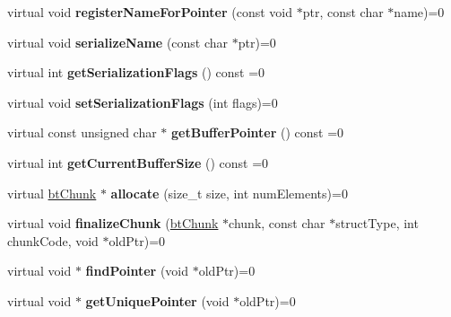 \begin{DoxyCompactItemize}
\item 
\mbox{\label{classbtSerializer_af4e2e226d06cd9264df03431fc376f25}} 
virtual void {\bfseries register\+Name\+For\+Pointer} (const void $\ast$ptr, const char $\ast$name)=0
\item 
\mbox{\label{classbtSerializer_a6f412ae1276a14cc818f4fd6b3cf167c}} 
virtual void {\bfseries serialize\+Name} (const char $\ast$ptr)=0
\item 
\mbox{\label{classbtSerializer_a634cc0d456c8d5bb2e2d242faf192787}} 
virtual int {\bfseries get\+Serialization\+Flags} () const =0
\item 
\mbox{\label{classbtSerializer_a1f46d70e6fd62daaccedc06073617203}} 
virtual void {\bfseries set\+Serialization\+Flags} (int flags)=0
\item 
\mbox{\label{classbtSerializer_ab61470624eb1e6d06d7de2943d2d92d0}} 
virtual const unsigned char $\ast$ {\bfseries get\+Buffer\+Pointer} () const =0
\item 
\mbox{\label{classbtSerializer_a49fa3c64ab1504a7a158f02c174e114f}} 
virtual int {\bfseries get\+Current\+Buffer\+Size} () const =0
\item 
\mbox{\label{classbtSerializer_a0bc96e86971e3410f66bc64bbce8ec81}} 
virtual \hyperlink{classbtChunk}{bt\+Chunk} $\ast$ {\bfseries allocate} (size\+\_\+t size, int num\+Elements)=0
\item 
\mbox{\label{classbtSerializer_ac98913802b276eed28d745ef422ac724}} 
virtual void {\bfseries finalize\+Chunk} (\hyperlink{classbtChunk}{bt\+Chunk} $\ast$chunk, const char $\ast$struct\+Type, int chunk\+Code, void $\ast$old\+Ptr)=0
\item 
\mbox{\label{classbtSerializer_a6f0e64395af88f0a3f43bf0b4ed90a39}} 
virtual void $\ast$ {\bfseries find\+Pointer} (void $\ast$old\+Ptr)=0
\item 
\mbox{\label{classbtSerializer_ab47015de46266c378ebba6329e71a5d6}} 
virtual void $\ast$ {\bfseries get\+Unique\+Pointer} (void $\ast$old\+Ptr)=0

\end{DoxyCompactItemize}
